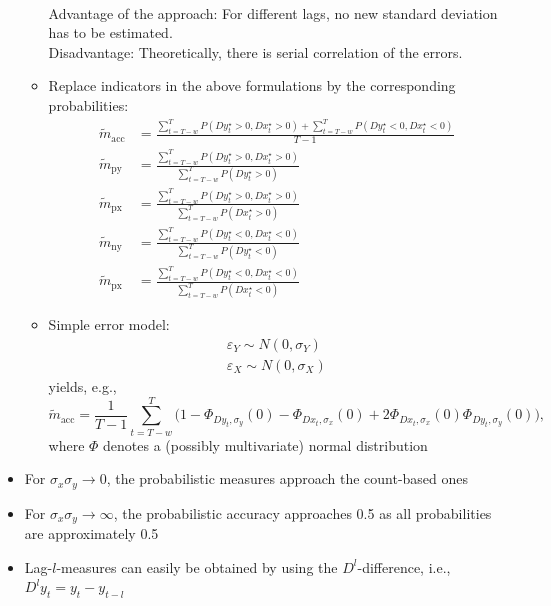 \documentclass[oneside]{article}
\theoremstyle{plain}%
\theoremstyle{definition}
\newcommand{\ydiff}{D y}
\newcommand{\ydifft}{Dy^\star}
\newcommand{\xdiff}{Dx}
\newcommand{\xdifft}{Dx^\star}
\newcommand{\Prob}[1]{P(#1)}
\newcommand{\mprob}{\tilde{m}}
\begin{document}
\begin{itemize}
\begin{itemize}
\begin{align}
 \end{align}
 Advantage of the approach: For different lags, no new standard deviation has to be estimated.\\
 Disadvantage: Theoretically, there is serial correlation of the errors.
\item  Replace indicators in the above formulations by the corresponding probabilities:
\begin{align}
		\mprob_{\text{acc}} &= \frac{\sum_{t=T-w}^T \Prob{ \ydifft_t > 0, \xdifft_t > 0} + \sum_{t=T-w}^T \Prob{\ydifft_t < 0, \xdifft_t < 0}}{T-1}  \\
   \mprob_{\text{py}} &= \frac{\sum_{t=T-w}^T \Prob{\ydifft_t > 0, \xdifft_t > 0}}{\sum_{t=T-w}^T \Prob{\ydifft_t > 0}} \\
    \mprob_{\text{px}} &= \frac{\sum_{t=T-w}^T \Prob{\ydifft_t > 0, \xdifft_t > 0}}{\sum_{t=T-w}^T \Prob{\xdifft_t > 0}} \\
    \mprob_{\text{ny}} &= \frac{\sum_{t=T-w}^T \Prob{\ydifft_t < 0, \xdifft_t < 0}}{\sum_{t=T-w}^T \Prob{\ydifft_t < 0}} \\
    \mprob_{\text{px}} &= \frac{\sum_{t=T-w}^T \Prob{\ydifft_t < 0, \xdifft_t < 0}}{\sum_{t=T-w}^T \Prob{\xdifft_t < 0}} 
\end{align} 
\item Simple error model:
  \begin{align}
	  \varepsilon_Y \sim N(0, \sigma_Y) \\
	  \varepsilon_X \sim N(0, \sigma_X)
  \end{align}
  yields, e.g.,
  	\begin{equation}
  		\mprob_{\text{acc}} = \frac{1}{T-1} \sum_{t=T-w}^T  \big( 1 - \Phi_{\ydiff_t, \sigma_y}(0) - \Phi_{\xdiff_t, \sigma_x} (0) + 2 \Phi_{\xdiff_t,\sigma_x}( 0)\Phi_{\ydiff_t,\sigma_y}( 0) \big), 
	\end{equation}
	where $\Phi$ denotes a (possibly multivariate) normal distribution
\end{itemize}
\item For $\sigma_x \sigma_y \rightarrow 0$, the probabilistic measures approach the count-based ones
\item For $\sigma_x \sigma_y \rightarrow \infty$, the probabilistic accuracy approaches   0.5 as all probabilities are approximately 0.5
\item Lag-$l$-measures can easily be obtained by using the $D^l$-difference, i.e., $D^l y_t = y_t - y_{t-l}$
\end{itemize}
\end{document}
